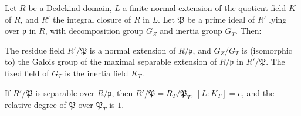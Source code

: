 Let $R$ be a Dedekind domain, $L$ a finite normal extension of the quotient field $K$ of $R$, and $R'$ the integral closure of $R$ in $L$. Let $\mathfrak{P}$ be a prime ideal of $R'$ lying over $\mathfrak{p}$ in $R$, with decomposition group $G_Z$ and inertia group $G_T$. Then:

The residue field $R'/\mathfrak{P}$ is a normal extension of $R/\mathfrak{p}$, and $G_Z/G_T$ is (isomorphic to) the Galois group of the maximal separable extension of $R/\mathfrak{p}$ in $R'/\mathfrak{P}$. The fixed field of $G_T$ is the inertia field $K_T$.

If $R'/\mathfrak{P}$ is separable over $R/\mathfrak{p}$, then $R'/\mathfrak{P} = R_T/\mathfrak{P}_T$, $[L:K_T] = e$, and the relative degree of $\mathfrak{P}$ over $\mathfrak{P}_T$ is $1$.
